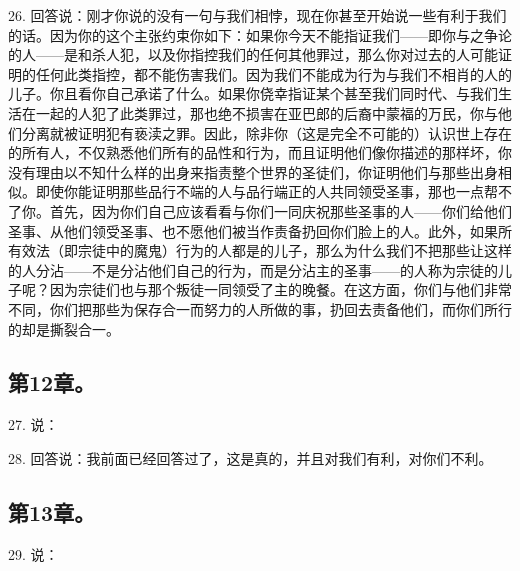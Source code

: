 26. 回答说：刚才你说的没有一句与我们相悖，现在你甚至开始说一些有利于我们的话。因为你的这个主张约束你如下：如果你今天不能指证我们——即你与之争论的人——是和杀人犯，以及你指控我们的任何其他罪过，那么你对过去的人可能证明的任何此类指控，都不能伤害我们。因为我们不能成为行为与我们不相肖的人的儿子。你且看你自己承诺了什么。如果你侥幸指证某个甚至我们同时代、与我们生活在一起的人犯了此类罪过，那也绝不损害在亚巴郎的后裔中蒙福的万民，你与他们分离就被证明犯有亵渎之罪。因此，除非你（这是完全不可能的）认识世上存在的所有人，不仅熟悉他们所有的品性和行为，而且证明他们像你描述的那样坏，你没有理由以不知什么样的出身来指责整个世界的圣徒们，你证明他们与那些出身相似。即使你能证明那些品行不端的人与品行端正的人共同领受圣事，那也一点帮不了你。首先，因为你们自己应该看看与你们一同庆祝那些圣事的人——你们给他们圣事、从他们领受圣事、也不愿他们被当作责备扔回你们脸上的人。此外，如果所有效法（即宗徒中的魔鬼）行为的人都是的儿子，那么为什么我们不把那些让这样的人分沾——不是分沾他们自己的行为，而是分沾主的圣事——的人称为宗徒的儿子呢？因为宗徒们也与那个叛徒一同领受了主的晚餐。在这方面，你们与他们非常不同，你们把那些为保存合一而努力的人所做的事，扔回去责备他们，而你们所行的却是撕裂合一。\par


\subsection{第12章。}

27. 说：\par

28. 回答说：我前面已经回答过了，这是真的，并且对我们有利，对你们不利。\par


\subsection{第13章。}

29. 说：\par

